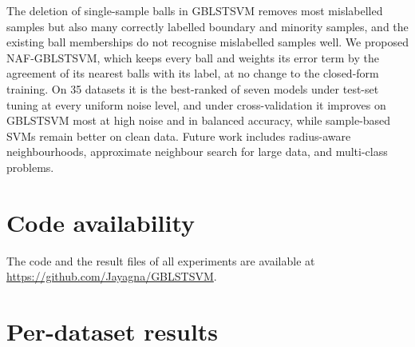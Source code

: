 \documentclass[preprint,12pt]{elsarticle}
\newcommand{\NAF}{NAF-GBLSTSVM}
\begin{document}
The deletion of single-sample balls in GBLSTSVM removes most mislabelled samples but also many correctly labelled boundary and minority samples, and the existing ball memberships do not recognise mislabelled samples well. We proposed \NAF{}, which keeps every ball and weights its error term by the agreement of its nearest balls with its label, at no change to the closed-form training. On 35 datasets it is the best-ranked of seven models under test-set tuning at every uniform noise level, and under cross-validation it improves on GBLSTSVM most at high noise and in balanced accuracy, while sample-based SVMs remain better on clean data. Future work includes radius-aware neighbourhoods, approximate neighbour search for large data, and multi-class problems.


\section*{Code availability}
The code and the result files of all experiments are available at \url{https://github.com/Jayagna/GBLSTSVM}.




\appendix
\section{Per-dataset results}
\label{app:per-dataset}





\end{document}
